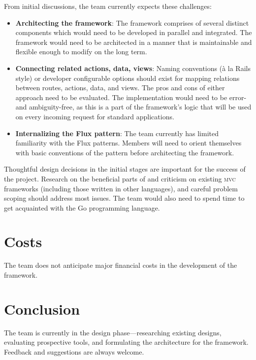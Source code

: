 \documentclass{article}
\begin{document}
From initial discussions, the team currently expects these challenges:

\begin{itemize}
    \item \textbf{Architecting the framework}: The framework comprises of several distinct components which would need to be developed in parallel and integrated. The framework would need to be architected in a manner that is maintainable and flexible enough to modify on the long term.
    \item \textbf{Connecting related actions, data, views}: Naming conventions (à la Rails style) or developer configurable options should exist for mapping relations between routes, actions, data, and views. The pros and cons of either approach need to be evaluated. The implementation would need to be error- and ambiguity-free, as this is a part of the framework's logic that will be used on every incoming request for standard applications.
    \item \textbf{Internalizing the Flux pattern}: The team currently has limited familiarity with the Flux patterns. Members will need to orient themselves with basic conventions of the pattern before architecting the framework.
\end{itemize}

Thoughtful design decisions in the initial stages are important for the success of the project. Research on the beneficial parts of and criticism on existing \textsc{mvc} frameworks (including those written in other languages), and careful problem scoping should address most issues. The team would also need to spend time to get acquainted with the Go programming language.

\section{Costs}

The team does not anticipate major financial costs in the development of the framework. 

\section{Conclusion}

The team is currently in the design phase---researching existing designs, evaluating prospective tools, and formulating the architecture for the framework. Feedback and suggestions are always welcome.\\
\end{document}
